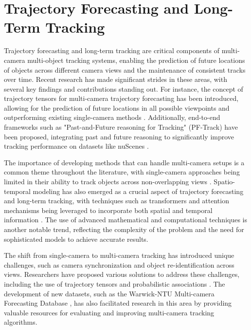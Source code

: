\documentclass[conference]{IEEEtran}
\begin{document}
\section{Trajectory Forecasting and Long-Term Tracking}
Trajectory forecasting and long-term tracking are critical components of multi-camera multi-object tracking systems, enabling the prediction of future locations of objects across different camera views and the maintenance of consistent tracks over time. Recent research has made significant strides in these areas, with several key findings and contributions standing out. For instance, the concept of trajectory tensors for multi-camera trajectory forecasting has been introduced, allowing for the prediction of future locations in all possible viewpoints and outperforming existing single-camera methods \cite{Multi-Camera Trajectory Forecasting with Trajectory Tensors}. Additionally, end-to-end frameworks such as "Past-and-Future reasoning for Tracking" (PF-Track) have been proposed, integrating past and future reasoning to significantly improve tracking performance on datasets like nuScenes \cite{Standing Between Past and Future: Spatio-Temporal Modeling for Multi-Camera 3D Multi-Object Tracking}.

The importance of developing methods that can handle multi-camera setups is a common theme throughout the literature, with single-camera approaches being limited in their ability to track objects across non-overlapping views \cite{Challenge of Multi-Camera Tracking}. Spatio-temporal modeling has also emerged as a crucial aspect of trajectory forecasting and long-term tracking, with techniques such as transformers and attention mechanisms being leveraged to incorporate both spatial and temporal information \cite{MCTR: Multi Camera Tracking Transformer}. The use of advanced mathematical and computational techniques is another notable trend, reflecting the complexity of the problem and the need for sophisticated models to achieve accurate results.

The shift from single-camera to multi-camera tracking has introduced unique challenges, such as camera synchronization and object re-identification across views. Researchers have proposed various solutions to address these challenges, including the use of trajectory tensors \cite{Multi-Camera Trajectory Forecasting with Trajectory Tensors} and probabilistic associations \cite{MCTR: Multi Camera Tracking Transformer}. The development of new datasets, such as the Warwick-NTU Multi-camera Forecasting Database \cite{Multi-Camera Trajectory Forecasting: Pedestrian Trajectory Prediction in a Network of Cameras}, has also facilitated research in this area by providing valuable resources for evaluating and improving multi-camera tracking algorithms.
\end{document}
